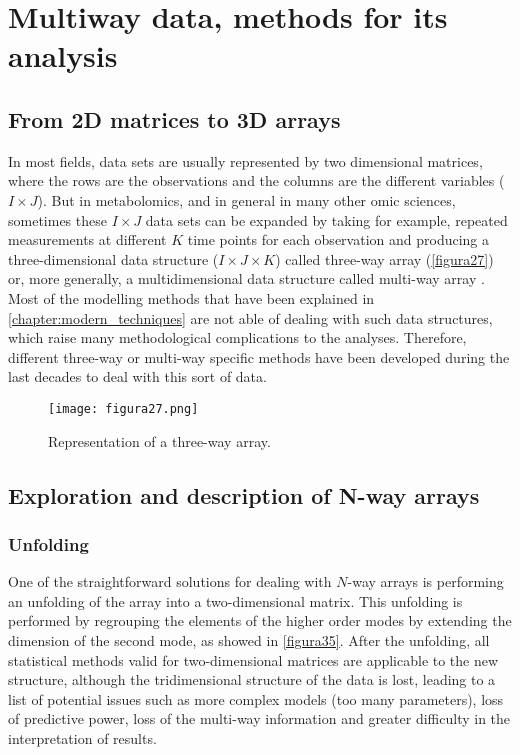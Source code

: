 
\chapter[Multiway data, methods for its analysis]{Multiway data, methods for its analysis}
\label{chapter:threeways}


\section{From 2D matrices to 3D arrays}
In most fields, data sets are usually represented by two dimensional matrices, where the rows are the observations and the columns are the different variables ($I \times J$). But in metabolomics, and in general in many other omic sciences, sometimes these $I \times J$ data sets can be expanded by taking for example, repeated measurements at different $K$ time points for each observation and producing a three-dimensional data structure ($I \times J \times K$) called three-way array (\autoref{figura27}) or, more generally, a multidimensional data structure called multi-way array \parencite{kroonenberg2016my}. Most of the modelling methods that have been explained in \autoref{chapter:modern_techniques} are not able of dealing with such data structures, which raise many methodological complications to the analyses. Therefore, different three-way or multi-way specific methods have been developed during the last decades to deal with this sort of data.

\begin{figure}[hbtp]
\centering
\texttt{[image: figura27.png]}
\caption{Representation of a three-way array.}
\label{figura27}
\end{figure}

\section{Exploration and description of N-way arrays}
\subsection{Unfolding}
One of the straightforward solutions for dealing with $N$-way arrays is performing an unfolding of the array into a two-dimensional matrix. This unfolding is performed by regrouping the elements of the higher order modes by extending the dimension of the second mode, as showed in \autoref{figura35}. After the unfolding, all statistical methods valid for two-dimensional matrices are applicable to the new structure, although the tridimensional structure of the data is lost, leading to a list of potential issues such as more complex models (too many parameters), loss of predictive power, loss of the multi-way information and greater difficulty in the interpretation of results.

